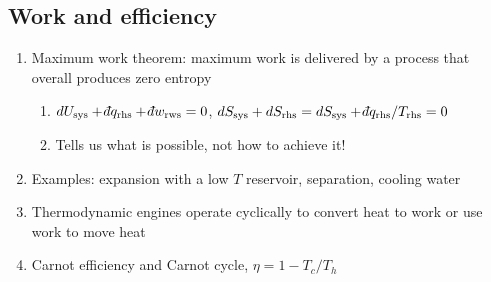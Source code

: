 \documentclass[11pt]{article}
\def\dbar{{\mathchar'26\mkern-12mu d}}
\begin{document}
\subsection{Work and efficiency}
\label{sec:org2f9ea9c}
\begin{enumerate}
\item Maximum work theorem: maximum work is delivered by a process that overall
produces zero entropy
\begin{enumerate}
\item \(dU_\text{sys}+\dbar q_\text{rhs} +\dbar w_\text{rws} =0\),
\(dS_\text{sys} + dS_\text{rhs}=dS_\text{sys} + \dbar q_\text{rhs}/T_\text{rhs}=0\)
\item Tells us what is possible, not how to achieve it!
\end{enumerate}
\item Examples: expansion with a low \(T\) reservoir, separation, cooling water
\item Thermodynamic engines operate cyclically to convert heat to work or use work to move heat
\item Carnot efficiency and Carnot cycle, \(\eta =1 - T_c/T_h\)
\end{enumerate}
\end{document}
